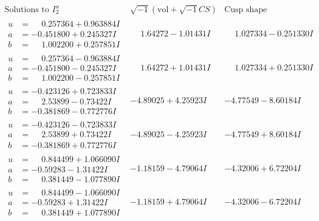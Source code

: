 \documentclass[1p]{elsarticle_modified}
\theoremstyle{definition}
\newcommand{\I}{\sqrt{-1}}
\begin{document}
$$\begin{array}{c|c|c}  
\text{Solutions to }I^u_{2}& \I (\text{vol} + \sqrt{-1}CS) & \text{Cusp shape}\\
 \hline 
\begin{aligned}
u &= \phantom{-}0.257364 + 0.963884 I \\
a &= -0.451800 + 0.245327 I \\
b &= \phantom{-}1.002200 + 0.257851 I\end{aligned}
 & \phantom{-}1.64272 - 1.01431 I & \phantom{-}1.027334 - 0.251330 I \\ \hline\begin{aligned}
u &= \phantom{-}0.257364 - 0.963884 I \\
a &= -0.451800 - 0.245327 I \\
b &= \phantom{-}1.002200 - 0.257851 I\end{aligned}
 & \phantom{-}1.64272 + 1.01431 I & \phantom{-}1.027334 + 0.251330 I \\ \hline\begin{aligned}
u &= -0.423126 + 0.723833 I \\
a &= \phantom{-}2.53899 - 0.73422 I \\
b &= -0.381869 - 0.772776 I\end{aligned}
 & -4.89025 + 4.25923 I & -4.77549 - 8.60184 I \\ \hline\begin{aligned}
u &= -0.423126 - 0.723833 I \\
a &= \phantom{-}2.53899 + 0.73422 I \\
b &= -0.381869 + 0.772776 I\end{aligned}
 & -4.89025 - 4.25923 I & -4.77549 + 8.60184 I \\ \hline\begin{aligned}
u &= \phantom{-}0.844499 + 1.066090 I \\
a &= -0.59283 - 1.31422 I \\
b &= \phantom{-}0.381449 - 1.077890 I\end{aligned}
 & -1.18159 - 4.79064 I & -4.32006 + 6.72204 I \\ \hline\begin{aligned}
u &= \phantom{-}0.844499 - 1.066090 I \\
a &= -0.59283 + 1.31422 I \\
b &= \phantom{-}0.381449 + 1.077890 I\end{aligned}
 & -1.18159 + 4.79064 I & -4.32006 - 6.72204 I \\ \hline\begin{aligned}

\end{aligned}
\end{array}$$
\end{document}
